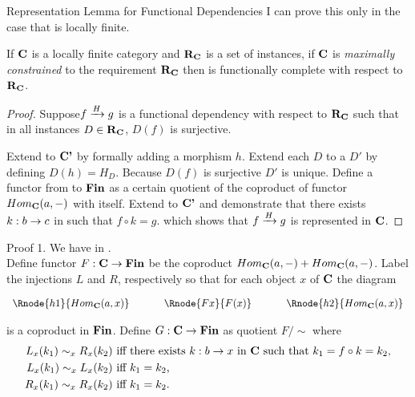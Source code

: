 \begin{frame}{Representation Lemma for Functional Dependencies}
I can prove this only in the case that \catcw is locally finite.

\begin{lemma}
If $\catc$ is a locally finite category and $\reqtc$ is a set of instances, if $\catc$ is 
\textit{maximally constrained} to the requirement $\reqtc$ then 
\catcw is functionally complete with respect to $\reqtc$.
\end{lemma}
\begin{proof}
Suppose$\fundep{H}{f}{g}$  is a functional dependency with respect to $\reqtc$
such that in all instances $D \in \reqtc$, $D(f)$ is surjective.

Extend \catcw to $\catcp$ by formally adding a morphism $h$. Extend each $D$ to a $D'$ by defining $D(h)=H_D$. 
Because $D(f)$ is surjective $D'$ is unique. 
Define a functor from \catcw to $\Fin$ as  a certain quotient of the coproduct of functor $Hom_{\catc}(a,-)$ with itself. 
Extend to $\catcp$ and demonstrate that there exists $k:b \morph c$ in \catcw such that $f \circ k=g$. 
which shows that $\fundep{H}{f}{g}$ is represented in $\catc$.
\end{proof}
\end{frame}

\begin{frame}{Proof 1.}
We have \fgsourcediagram in \catc.\\
\medskip
Define functor $F: \catc \morph \Fin$ be the coproduct $Hom_{\catc}(a,-) + Hom_{\catc}(a,-)$.
Label the injections $L$ and $R$, respectively so that
for each object $x$ of $\catc$ the diagram
\begin{center}
$
\begin{array}{c p{0.5cm} c p{0.5cm} c  }
\Rnode{h1}{Hom_{\catc}(a,x)}  &&\Rnode{Fx}{F(x)}  &&   \Rnode{h2}{Hom_{\catc}(a,x)}       
\end{array} 
$
\end{center}
is a coproduct in $\Fin$.
\medskip
Define $G: \catc \morph \Fin$ as quotient $F/\sim$ where
\begin{align*}
L_x(k_1) \sim_x R_x(k_2) & \mbox{ iff there exists $k:b \morph x$ in $\catc$ such that $k_1 = f \circ k = k_2$,}\\
L_x(k_1) \sim_x L_x(k_2) & \mbox{ iff $k_1 = k_2$,} \\
R_x(k_1) \sim_x R_x(k_2) & \mbox{ iff $k_1 = k_2$.} \\
\end{align*} 
\end{frame}

